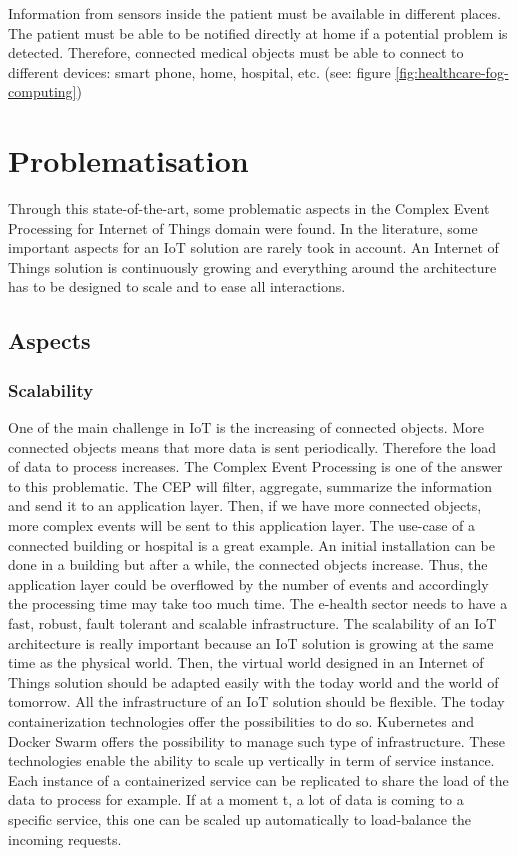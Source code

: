 \documentclass[11pt]{article}
\begin{document}
Information from sensors inside the patient must be available in different places. The patient must be able to be notified directly at home if a potential problem is detected. Therefore, connected medical objects must be able to connect to different devices: smart phone, home, hospital, etc. (see: figure \ref{fig:healthcare-fog-computing}) 

\section{Problematisation} \label{problematic}

Through this state-of-the-art, some problematic aspects in the Complex Event Processing for Internet of Things domain were found. In the literature, some important aspects for an IoT solution are rarely took in account. An Internet of Things solution is continuously growing and everything around the architecture has to be designed to scale and to ease all interactions. 

\subsection{Aspects}

\subsubsection{Scalability}

One of the main challenge in IoT is the increasing of connected objects. More connected objects means that more data is sent periodically. Therefore the load of data to process increases. The Complex Event Processing is one of the answer to this problematic. The CEP will filter, aggregate, summarize the information and send it to an application layer. Then, if we have more connected objects, more complex events will be sent to this application layer. The use-case of a connected building or hospital is a great example. An initial installation can be done in a building but after a while, the connected objects increase. Thus, the application layer could be overflowed by the number of events and accordingly the processing time may take too much time. The e-health sector needs to have a fast, robust, fault tolerant and scalable infrastructure. The scalability of an IoT architecture is really important because an IoT solution is growing at the same time as the physical world. Then, the virtual world designed in an Internet of Things solution should be adapted easily with the today world and the world of tomorrow. 
\newline
\newline
All the infrastructure of an IoT solution should be flexible. The today containerization technologies offer the possibilities to do so. Kubernetes and Docker Swarm offers the possibility to manage such type of infrastructure. These technologies enable the ability to scale up vertically in term of service instance. Each instance of a containerized service can be replicated to share the load of the data to process for example. If at a moment t, a lot of data is coming to a specific service, this one can be scaled up automatically to load-balance the incoming requests. 
\end{document}
